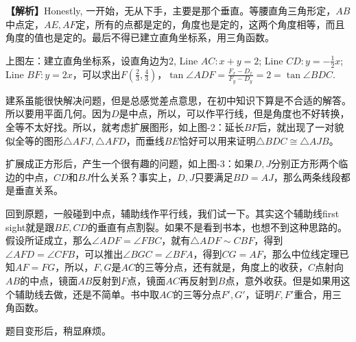 \documentclass[../main.tex]{subfiles}
\begin{document}
\begin{solution}
\textbf{【解析】}Honestly, 一开始，无从下手，主要是那个垂直。等腰直角三角形定，$AB$中点定，$AE,AF$定，所有的点都是定的，角度也是定的，这两个角度相等，而且角度的值也是定的。最后不得已建立直角坐标系，用三角函数。

上图左：建立直角坐标系，设直角边为$2$, Line $AC: x+y=2$; Line $CD: y=-\frac{1}{2}x$; Line $BF: y=2x$，可以求出$F(\frac{2}{3}, \frac{4}{3})$，$\tan \angle ADF=\frac{F_x-D_x}{F_{y}-D_y}=2=\tan \angle BDC$.

建系虽能很快解决问题，但是总感觉差点意思，在初中知识下算是不合适的解答。所以要用平面几何。因为$D$是中点，所以，可以作平行线，但是角度也不好转换，全等不太好找。所以，就考虑扩展图形，如上图-2：延长$BF$后，就出现了一对貌似全等的图形$\triangle AFJ, \triangle AFD$，而垂线$BE$恰好可以用来证明$\triangle BDC \cong \triangle AJB$。

扩展成正方形后，产生一个很有趣的问题，如上图-3：如果$D,J$分别正方形两个临边的中点，$CD$和$BJ$什么关系？事实上，$D,J$只要满足$BD=AJ$，那么两条线段都是垂直关系。

回到原题，一般碰到中点，辅助线作平行线，我们试一下。其实这个辅助线first sight就是跟$BE,CD$的垂直有点割裂。如果不是看到书本，也想不到这种思路的。假设所证成立，那么$\angle ADF = \angle FBC$，就有$\triangle ADF \sim CBF$，得到$\angle AFD = \angle CFB$，可以推出$\angle BGC = \angle BFA$，得到$CG=AF$，那么中位线定理已知$AF=FG$，所以，$F,G$是$AC$的三等分点，还有就是，角度上的收获，$C$点射向$AB$的中点，镜面$AB$反射到$F$点，镜面$AC$再反射到$B$点，意外收获。但是如果用这个辅助线去做，还是不简单。书中取$AC$的三等分点$F', G'$，证明$F,F'$重合，用三角函数。

题目变形后，稍显麻烦。
\end{solution}

\hrulefill
\end{document}
